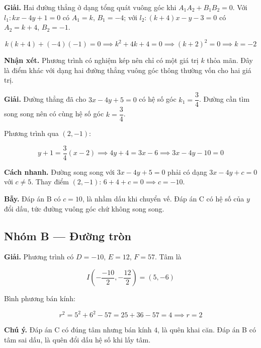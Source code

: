 \documentclass[11pt, a4paper]{article}
\begin{document}
\begin{dapan}[6 — Đáp án B]
\textbf{Giải.} Hai đường thẳng ở dạng tổng quát vuông góc khi $A_1A_2 + B_1B_2 = 0$. Với $l_1: kx - 4y + 1 = 0$ có $A_1 = k$, $B_1 = -4$; với $l_2: (k+4)x - y - 3 = 0$ có $A_2 = k+4$, $B_2 = -1$.

$$k(k+4) + (-4)(-1) = 0 \implies k^2 + 4k + 4 = 0 \implies (k+2)^2 = 0 \implies k = -2$$

\textbf{Nhận xét.} Phương trình có nghiệm kép nên chỉ có một giá trị $k$ thỏa mãn. Đây là điểm khác với dạng hai đường thẳng vuông góc thông thường vốn cho hai giá trị.
\end{dapan}

\begin{dapan}[7 — Đáp án A]
\textbf{Giải.} Đường thẳng đã cho $3x - 4y + 5 = 0$ có hệ số góc $k_1 = \dfrac{3}{4}$. Đường cần tìm song song nên có cùng hệ số góc $k = \dfrac{3}{4}$.

Phương trình qua $(2, -1)$:

$$y + 1 = \frac{3}{4}(x - 2) \implies 4y + 4 = 3x - 6 \implies 3x - 4y - 10 = 0$$

\textbf{Cách nhanh.} Đường song song với $3x - 4y + 5 = 0$ phải có dạng $3x - 4y + c = 0$ với $c \ne 5$. Thay điểm $(2,-1)$: $6 + 4 + c = 0 \implies c = -10$.

\textbf{Bẫy.} Đáp án B có $c = 10$, là nhầm dấu khi chuyển vế. Đáp án C có hệ số của $y$ đổi dấu, tức đường vuông góc chứ không song song.
\end{dapan}

\subsection*{Nhóm B — Đường tròn}

\begin{dapan}[8 — Đáp án A]
\textbf{Giải.} Phương trình có $D = -10$, $E = 12$, $F = 57$. Tâm là

$$I\left(-\frac{-10}{2}, -\frac{12}{2}\right) = (5, -6)$$

Bình phương bán kính:

$$r^2 = 5^2 + 6^2 - 57 = 25 + 36 - 57 = 4 \implies r = 2$$

\textbf{Chú ý.} Đáp án C có đúng tâm nhưng bán kính $4$, là quên khai căn. Đáp án B có tâm sai dấu, là quên đổi dấu hệ số khi lấy tâm.
\end{dapan}
\end{document}
